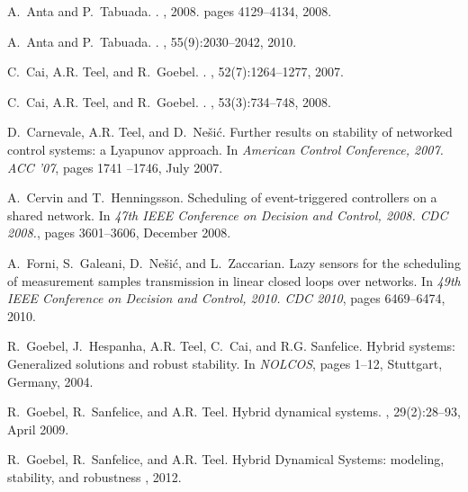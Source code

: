 \documentclass[twocolumn]{autart}
\begin{document}
\begin{thebibliography}{10}

A.~Anta and P.~Tabuada.
.
, 2008. pages 4129--4134, 2008.

A.~Anta and P.~Tabuada.
.
, 55(9):2030--2042, 2010.

C.~Cai, A.R. Teel, and R.~Goebel.
.
, 52(7):1264--1277, 2007.

C.~Cai, A.R. Teel, and R.~Goebel.
.
, 53(3):734--748, 2008.

D.~Carnevale, A.R. Teel, and D.~Ne\v{s}i\'{c}.
\newblock Further results on stability of networked control systems: a
  {L}yapunov approach.
\newblock In {\em American Control Conference, 2007. ACC '07}, pages 1741
  --1746, July 2007.

A.~Cervin and T.~Henningsson.
\newblock Scheduling of event-triggered controllers on a shared network.
\newblock In {\em 47th IEEE Conference on Decision and Control, 2008. CDC
  2008.}, pages 3601--3606, December 2008.

A.~Forni, S.~Galeani, D.~Ne\v{s}i\'{c}, and L.~Zaccarian.
\newblock Lazy sensors for the scheduling of measurement samples transmission in linear closed loops over networks.
\newblock In {\em 49th IEEE Conference on Decision and Control, 2010. CDC
  2010}, pages 6469--6474, 2010.

R.~Goebel, J.~Hespanha, A.R. Teel, C.~Cai, and R.G. Sanfelice.
\newblock Hybrid systems: {G}eneralized solutions and robust stability.
\newblock In {\em {NOLCOS}}, pages 1--12, Stuttgart, Germany, 2004.

R.~Goebel, R.~Sanfelice, and A.R. Teel.
\newblock Hybrid dynamical systems.
, 29(2):28--93, April 2009.

R.~Goebel, R.~Sanfelice, and A.R. Teel.
\newblock Hybrid Dynamical Systems: modeling, stability, and robustness
, 2012.


\end{thebibliography}
\end{document}
